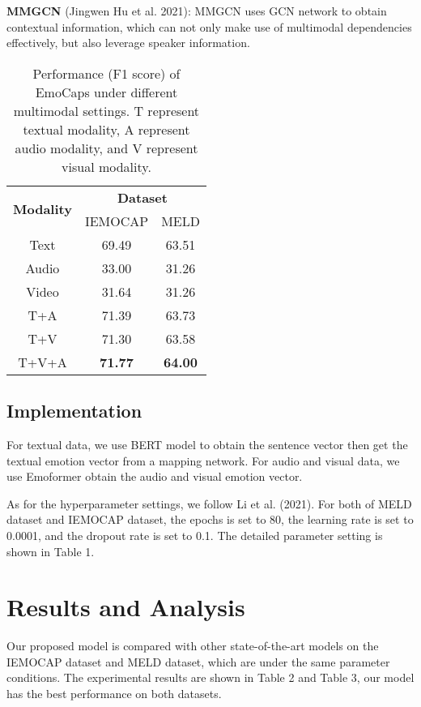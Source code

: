 \documentclass[11pt]{article}
\begin{document}
\noindent\textbf{MMGCN} (Jingwen Hu et al. 2021): MMGCN uses GCN network to obtain contextual information, which can not only make use of multimodal dependencies effectively, but also leverage speaker information.
\begin{table}[]
	\centering
	\begin{tabular}{c|c|c}
		\hline
		\multirow{2}{*}{\textbf{Modality}} & \multicolumn{2}{c}{\textbf{Dataset}} \\ \cline{2-3} 
		& IEMOCAP           & MELD              \\ \hline
		Text                               & 69.49             & 63.51             \\
		Audio                              & 33.00             & 31.26             \\
		Video                              & 31.64             & 31.26             \\
		T+A                                & 71.39             & 63.73             \\
		T+V                                & 71.30             & 63.58             \\
		T+V+A                              & \textbf{71.77}    & \textbf{64.00}    \\ \hline
	\end{tabular}
	\caption{Performance (F1 score) of EmoCaps under different multimodal settings. T represent textual modality, A represent audio modality, and V represent visual modality.}
\end{table}
\subsection{Implementation}
For textual data, we use BERT model to obtain the sentence vector then get the textual emotion vector from a mapping network. For audio and visual data, we use Emoformer obtain the audio and visual emotion vector. 

As for the hyperparameter settings, we follow Li et al. (2021). For both of MELD dataset and IEMOCAP dataset, the epochs is set to 80, the learning rate is set to 0.0001, and the dropout rate is set to 0.1. The detailed parameter setting is shown in Table 1.

\section{Results and Analysis}
Our proposed model is compared with other state-of-the-art models on the IEMOCAP dataset and MELD dataset, which are under the same parameter conditions. The experimental results are shown in Table 2 and Table 3, our model has the best performance on both datasets.
\end{document}
